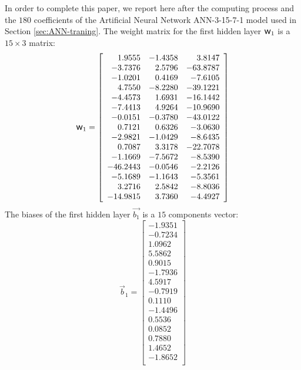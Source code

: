 \documentclass[algorithms,article,submit,pdftex,moreauthors]{Definitions/mdpi}
\DeclareRobustCommand{\w}{\mbox{\large\ensuremath{\mathsf{w}}}}
\begin{document}
In order to complete this paper, we report here after the computing process and the $180$ coefficients of the Artificial Neural Network ANN-3-15-7-1 model used in Section \ref{sec:ANN-traning}.
The weight matrix for the first hidden layer $\w_1$ is a $15\times3$ matrix:
\begin{equation*}
\w_1 = \left[
\begin{array}{rrr}
1.9555 & -1.4358 & 3.8147\\ 
-3.7376 & 2.5796 & -63.8787\\ 
-1.0201 & 0.4169 & -7.6105\\ 
4.7550 & -8.2280 & -39.1221\\ 
-4.4573 & 1.6931 & -16.1442\\ 
-7.4413 & 4.9264 & -10.9690\\ 
-0.0151 & -0.3780 & -43.0122\\ 
0.7121 & 0.6326 & -3.0630\\ 
-2.9821 & -1.0429 & -8.6435\\ 
0.7087 & 3.3178 & -22.7078\\ 
-1.1669 & -7.5672 & -8.5390\\ 
-46.2443 & -0.0546 & -2.2126\\ 
-5.1689 & -1.1643 & -5.3561\\ 
3.2716 & 2.5842 & -8.8036\\ 
-14.9815 & 3.7360 & -4.4927\\ 
\end{array}\right]
\end{equation*}
The biases of the first hidden layer $\overrightarrow{b_1}$ is a $15$ components vector:
\begin{equation*}
\overrightarrow{b}_1 = \left[
\begin{array}{r}
-1.9351\\ 
-0.7234\\ 
1.0962\\ 
5.5862\\ 
0.9015\\ 
-1.7936\\ 
4.5917\\ 
-0.7919\\ 
0.1110\\ 
-1.4496\\ 
0.5536\\ 
0.0852\\ 
0.7880\\ 
1.4652\\ 
-1.8652\\ 
\end{array}\right]
\end{equation*}
\end{document}
